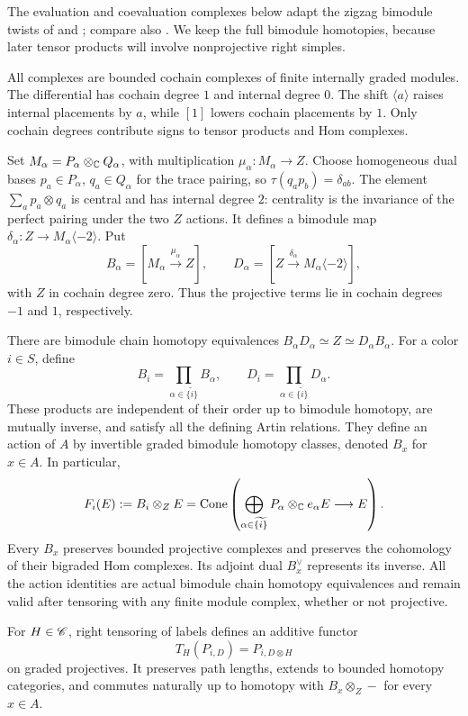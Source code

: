 The evaluation and coevaluation complexes below adapt the zigzag
bimodule twists of \cite[Proposition~2.4 and Theorem~2.5]{KhovanovSeidel2002}
and \cite[Section~4.6, Proposition~7]{HuerfanoKhovanov2001}; compare also
\cite[Definition~5.2 and Proposition~5.3]{HengLicata2024}.
We keep the full bimodule homotopies, because later tensor products
will involve nonprojective right simples.

All complexes are bounded cochain complexes of finite internally
graded modules.  The differential has cochain degree $1$ and
internal degree $0$.  The shift $\langle a\rangle$ raises internal
placements by $a$, while $[1]$ lowers cochain placements by $1$.
Only cochain degrees contribute signs to tensor products and Hom
complexes.

Set $M_\alpha=P_\alpha\otimes_\mathbb C Q_\alpha$, with multiplication
$\mu_\alpha:M_\alpha\to Z$.  Choose homogeneous dual bases
$p_a\in P_\alpha$, $q_a\in Q_\alpha$ for the trace pairing, so
$\tau(q_ap_b)=\delta_{ab}$.  The element
$\sum_a p_a\otimes q_a$ is central and has internal degree $2$:
centrality is the invariance of the perfect pairing under the
two $Z$ actions.  It defines a bimodule map
$\delta_\alpha:Z\to M_\alpha\langle-2\rangle$.  Put
\begin{equation}
 B_\alpha=[M_\alpha\xrightarrow{\mu_\alpha}Z],
 \qquad
 D_\alpha=[Z\xrightarrow{\delta_\alpha}
                      M_\alpha\langle-2\rangle],
 \label{cat:elementary-twists}
\end{equation}
with $Z$ in cochain degree zero.  Thus the projective terms lie
in cochain degrees $-1$ and $1$, respectively.

\begin{proposition}
\label{cat:action}
There are bimodule chain homotopy equivalences
$B_\alpha D_\alpha\simeq Z\simeq D_\alpha B_\alpha$.
For a color $i\in S$, define
\[
 B_i=\prod_{\alpha\in\widetilde{\{i\}}}B_\alpha,
 \qquad
 D_i=\prod_{\alpha\in\widetilde{\{i\}}}D_\alpha.
\]
These products are independent of their order up to bimodule
homotopy, are mutually inverse, and satisfy all the defining Artin
relations.  They define an action of $A$ by invertible graded
bimodule homotopy classes, denoted $B_x$ for $x\in A$.
In particular,
\begin{equation}
 F_i(E):=B_i\otimes_ZE
  =\operatorname{Cone}\left(
       \bigoplus_{\alpha\in\widetilde{\{i\}}}
       P_\alpha\otimes_\mathbb C e_\alpha E\longrightarrow E\right).
 \label{cat:color-evaluation}
\end{equation}
Every $B_x$ preserves bounded projective complexes and preserves
the cohomology of their bigraded Hom complexes.  Its adjoint dual
$B_x^\vee$ represents its inverse.  All the action identities are
actual bimodule chain homotopy equivalences and remain valid after
tensoring with any finite module complex, whether or not projective.

For $H\in\mathscr C$, right tensoring of labels defines an additive functor
\[
 T_H(P_{i,D})=P_{i,D\otimes H}
\]
on graded projectives.  It preserves path lengths, extends to
bounded homotopy categories, and commutes naturally up to homotopy
with $B_x\otimes_Z-$ for every $x\in A$.
\end{proposition}

